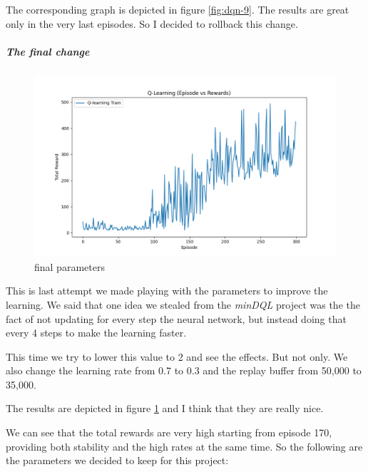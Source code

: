 \documentclass{article}
\begin{document}
The corresponding graph is depicted in figure \ref*{fig:dqn-9}.
The results are great only in the very last episodes.
So I decided to rollback this change.

\subparagraph{The final change}

\begin{figure}
  \includegraphics[width=\linewidth]{DQN-0010.png}
  \caption{final parameters}
  \label{fig:dqn-10}
\end{figure}

This is last attempt we made playing with the parameters to improve the learning.
We said that one idea we stealed from the \emph{minDQL} project was the the fact of not
updating for every step the neural network, but instead doing that every 4 steps
to make the learning faster.

This time we try to lower this value to 2 and see the effects.
But not only. We also change the learning rate from 0.7 to 0.3 and the replay buffer from 50,000 to 35,000.

The results are depicted in figure \ref{fig:dqn-10} and I think that they are really nice.

We can see that the total rewards are very high starting from episode 170,
providing both stability and the high rates at the same time.
So the following are the parameters we decided to keep for this project:
\end{document}
